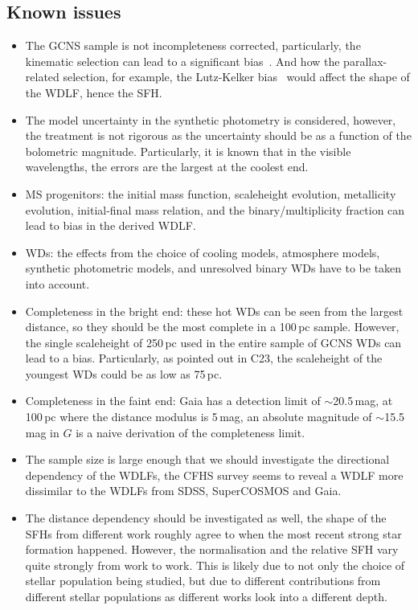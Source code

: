 \documentclass[fleqn,usenatbib]{mnras}
\begin{document}
\subsection*{Known issues}
\begin{itemize}
    \item The GCNS sample is not incompleteness corrected, particularly, the
    kinematic selection can lead to a significant 
    bias~\citep{2015MNRAS.450.4098L}. And how the parallax-related selection,
    for example, the Lutz-Kelker bias~\citep{1973PASP...85..573L} would affect
    the shape of the WDLF, hence the SFH.
    \item The model uncertainty in the synthetic photometry is considered,
    however, the treatment is not rigorous as the uncertainty should be as
    a function of the bolometric magnitude. Particularly, it is known that
    in the visible wavelengths, the errors are the largest at the coolest end.
    \item MS progenitors: the initial mass function, scaleheight evolution,
    metallicity evolution, initial-final mass relation, and the
    binary/multiplicity fraction can lead to bias in the derived WDLF.
    \item WDs: the effects from the choice of cooling models, atmosphere
    models, synthetic photometric models, and unresolved binary WDs have to be
    taken into account.
    \item Completeness in the bright end: these hot WDs can be seen from the
    largest distance, so they should be the most complete in a 100\,pc
    sample. However, the single scaleheight of 250\,pc used in the entire
    sample of GCNS WDs can lead to a bias. Particularly, as pointed out in
    C23, the scaleheight of the youngest WDs could be
    as low as 75\,pc.
    \item Completeness in the faint end: Gaia has a detection limit of
    $\sim$20.5\,mag, at 100\,pc where the distance modulus is 5\,mag, an
    absolute magnitude of $\sim$15.5\,mag in $G$ is a naive derivation of the
    completeness limit.
    \item The sample size is large enough that we should investigate the
    directional dependency of the WDLFs, the CFHS survey seems to reveal a
    WDLF more dissimilar to the WDLFs from SDSS, SuperCOSMOS and Gaia.
    \item The distance dependency should be investigated as well, the shape of
    the SFHs from different work roughly agree to when the most recent strong
    star formation happened. However, the normalisation and the relative SFH
    vary quite strongly from work to work. This is likely due to not only the
    choice of stellar population being studied, but due to different
    contributions from different stellar populations as different works look
    into a different depth.
\end{itemize}
\end{document}
